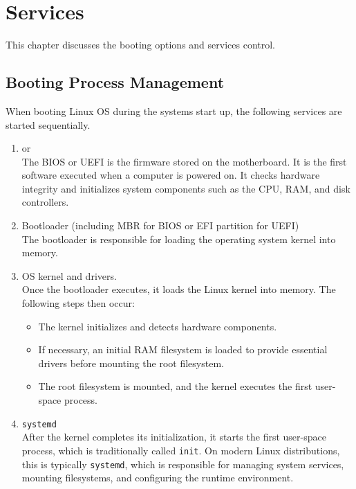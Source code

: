 \chapter{Services}

This chapter discusses the booting options and services control.

\section{Booting Process Management}

When booting Linux OS during the systems start up, the following services are started sequentially.

\begin{enumerate}
  \item {} or  \\
  The BIOS or UEFI is the firmware stored on the motherboard. It is the first software executed when a computer is powered on. It checks hardware integrity and initializes system components such as the CPU, RAM, and disk controllers.
  
  \item Bootloader (including MBR for BIOS or EFI partition for UEFI) \\
  The bootloader is responsible for loading the operating system kernel into memory.
  
  \item OS kernel and drivers. \\
  Once the bootloader executes, it loads the Linux kernel into memory. The following steps then occur:
  \begin{itemize}
      \item The kernel initializes and detects hardware components.
      \item If necessary, an initial RAM filesystem is loaded to provide essential drivers before mounting the root filesystem.
      \item The root filesystem is mounted, and the kernel executes the first user-space process.
  \end{itemize}
  
  \item \texttt{systemd} \\
  After the kernel completes its initialization, it starts the first user-space process, which is traditionally called \texttt{init}. On modern Linux distributions, this is typically \texttt{systemd}, which is responsible for managing system services, mounting filesystems, and configuring the runtime environment.
  

\end{enumerate}
